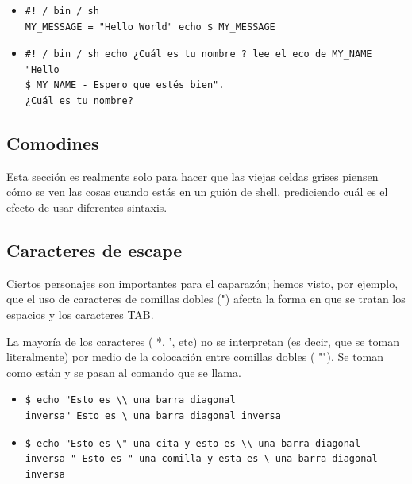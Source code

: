 \documentclass[12pt,letterpaper]{article}
\begin{document}
{	\begin{itemize}
        \color{red} 
        \item
        \begin{verbatim}
#! / bin / sh 
MY_MESSAGE = "Hello World" echo $ MY_MESSAGE
        \end{verbatim}
        \item
        \begin{verbatim}
#! / bin / sh echo ¿Cuál es tu nombre ? lee el eco de MY_NAME "Hello
$ MY_NAME - Espero que estés bien".
¿Cuál es tu nombre?
		\end{verbatim}
        
        \end{itemize}
        
        \color{black}
        \subsection{Comodines}
        Esta sección es realmente solo para hacer que las viejas celdas grises piensen cómo se ven las cosas cuando estás en un guión de shell, prediciendo cuál es el efecto de usar diferentes sintaxis. 
        \subsection{Caracteres de escape}
        Ciertos personajes son importantes para el caparazón; hemos visto, por ejemplo, que el uso de caracteres de comillas dobles (") afecta la forma en que se tratan los espacios y los caracteres TAB.\par
        La mayoría de los caracteres ( *, ', etc) no se interpretan (es decir, que se toman literalmente) por medio de la colocación entre comillas dobles ( ""). Se toman como están y se pasan al comando que se llama.
        \color{red}
        \begin{itemize}
        \item
		\begin{verbatim}
$ echo "Esto es \\ una barra diagonal
inversa" Esto es \ una barra diagonal inversa
		\end{verbatim}
		\item
		\begin{verbatim}
$ echo "Esto es \" una cita y esto es \\ una barra diagonal
inversa " Esto es " una comilla y esta es \ una barra diagonal inversa
		\end{verbatim}
        \end{itemize}
		\color{black}
}
\end{document}
